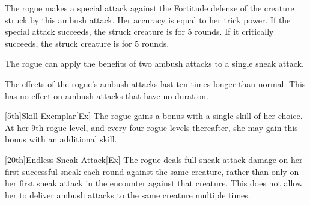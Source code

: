     The rogue makes a special attack against the Fortitude defense of the creature struck by this ambush attack.
    Her accuracy is equal to her trick power.
    If the special attack succeeds, the struck creature is \staggered for 5 rounds.
    If it critically succeeds, the struck creature is \paralyzed for 5 rounds.


    The rogue can apply the benefits of two ambush attacks to a single sneak attack.

    The effects of the rogue's ambush attacks last ten times longer than normal.
    This has no effect on ambush attacks that have no duration.

[5th]{Skill Exemplar}[Ex]
The rogue gains a  bonus with a single skill of her choice.
At her 9th rogue level, and every four rogue levels thereafter, she may gain this bonus with an additional skill.

[20th]{Endless Sneak Attack}[Ex]
The rogue deals full sneak attack damage on her first successful sneak each round against the same creature, rather than only on her first sneak attack in the encounter against that creature.
This does not allow her to deliver ambush attacks to the same creature multiple times.

